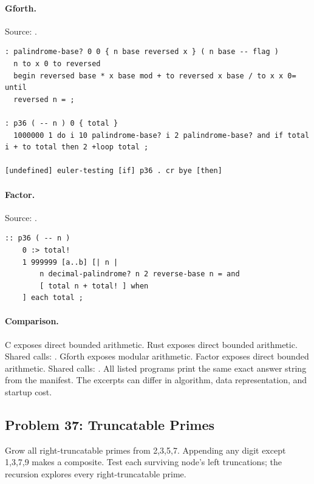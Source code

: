 \paragraph{Gforth.} Source: .
\begin{lstlisting}
: palindrome-base? 0 0 { n base reversed x } ( n base -- flag )
  n to x 0 to reversed
  begin reversed base * x base mod + to reversed x base / to x x 0= until
  reversed n = ;

: p36 ( -- n ) 0 { total }
  1000000 1 do i 10 palindrome-base? i 2 palindrome-base? and if total i + to total then 2 +loop total ;

[undefined] euler-testing [if] p36 . cr bye [then]
\end{lstlisting}

\paragraph{Factor.} Source: .
\begin{lstlisting}
:: p36 ( -- n )
    0 :> total!
    1 999999 [a..b] [| n |
        n decimal-palindrome? n 2 reverse-base n = and
        [ total n + total! ] when
    ] each total ;
\end{lstlisting}

\paragraph{Comparison.}
C exposes direct bounded arithmetic. Rust exposes direct bounded arithmetic. Shared calls: \texttt{}. Gforth exposes modular arithmetic. Factor exposes direct bounded arithmetic. Shared calls: \texttt{}.
All listed programs print the same exact answer string from the manifest. The excerpts can differ in algorithm, data representation, and startup cost.

\subsection{Problem 37: Truncatable Primes}
\label{walkthrough:p37}
Grow all right-truncatable primes from 2,3,5,7. Appending any digit except 1,3,7,9 makes a composite. Test each surviving node's left truncations; the recursion explores every right-truncatable prime.

